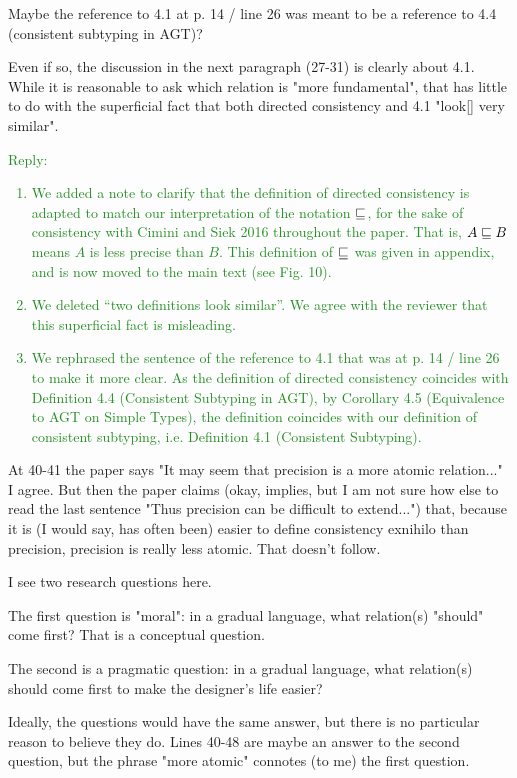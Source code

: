 \documentclass[dvipsnames]{article}
\newcommand\reply[1]{\textcolor{ForestGreen}{Reply: #1}}
\begin{document}
Maybe the reference to 4.1 at p. 14 / line 26 was meant to be a reference to 4.4
(consistent subtyping in AGT)?

Even if so, the discussion in the next paragraph (27-31) is clearly about 4.1.
While it is reasonable to ask which relation is "more fundamental", that has
little to do with the superficial fact that both directed consistency and 4.1
"look[] very similar".

\reply{
  \begin{enumerate}
  \item We added a note to clarify that the definition of directed consistency
    is adapted to match our interpretation of the notation $\sqsubseteq$, for the
    sake of consistency with Cimini and Siek 2016 throughout the paper. That is, $A \sqsubseteq B$ means $A$ is
    less precise than $B$. This definition of $\sqsubseteq$ was given in appendix,
    and is now moved to the main text (see Fig. 10).
  \item We deleted ``two definitions look similar''. We agree with the reviewer
    that this superficial fact is misleading.
  \item We rephrased the sentence of the reference to 4.1 that was at p. 14 /
    line 26 to make it more clear. As the definition of directed consistency
    coincides with Definition 4.4 (Consistent Subtyping in AGT), by Corollary
    4.5 (Equivalence to AGT on Simple Types), the definition coincides with our
    definition of consistent subtyping, i.e. Definition 4.1 (Consistent
    Subtyping).
  \end{enumerate}
  }

At 40-41 the paper says "It may seem that precision is a more atomic
relation..." I agree. But then the paper claims (okay, implies, but I am not
sure how else to read the last sentence "Thus precision can be difficult to
extend...") that, because it is (I would say, has often been) easier to define
consistency exnihilo than precision, precision is really less atomic. That
doesn't follow.

I see two research questions here.

The first question is "moral": in a gradual language, what relation(s) "should"
come first? That is a conceptual question.

The second is a pragmatic question: in a gradual language, what relation(s)
should come first to make the designer's life easier?

Ideally, the questions would have the same answer, but there is no particular
reason to believe they do. Lines 40-48 are maybe an answer to the second
question, but the phrase "more atomic" connotes (to me) the first question.
\end{document}
